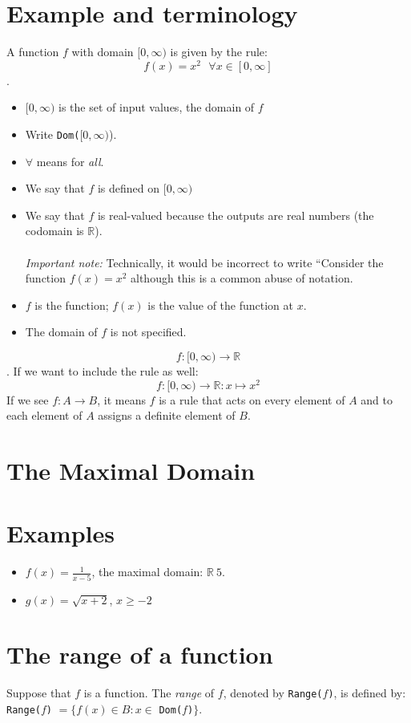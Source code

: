 \section{Example and terminology}
A function $f$ with domain $[0,\infty)$ is given by the rule:
$$f(x) = x^2 ~~~ \forall x \in [0,\infty] $$.
\begin{itemize}
  \item $[0,\infty)$ is the set of input values, the domain of $f$
  \item Write \texttt{Dom($[0,\infty)$}).
  \item $\forall$ means for \emph{all}.
  \item We say that $f$ is defined on $[0,\infty)$
  \item We say that $f$ is real-valued because the outputs are real numbers (the
  codomain is $\mathbb{R}$).\\
  \\
  \emph{Important note:} Technically, it would be incorrect to write ``Consider the function $f(x) = x^2$
  although this is a common abuse of notation.

  \item $f$ is the function; $f(x)$ is the value of the function at $x$.
  \item The domain of $f$ is not specified.  
\end{itemize}

$$f:[0,\infty) \to \mathbb{R}$$.
If we want to include the rule as well:
$$f:[0,\infty) \to \mathbb{R} : x \mapsto x^2$$
If we see $f:A \to B$, it means $f$ is a rule that acts on every element of $A$
and to each element of $A$ assigns a definite element of $B$.

\section{The Maximal Domain}

\section{Examples}
\begin{itemize}
  \item $f(x) = \frac{1}{x-5}$, the maximal domain: $\mathbb{R} \ {5} $.
  \item $g(x) = \sqrt{x+2}$, $x \geq -2$
\end{itemize}

\section{The range of a function}
Suppose that $f$ is a function. The \emph{range} of $f$, denoted by \texttt{Range($f$)},
is defined by:\\
\texttt{Range($f$)} $= \{f(x) \in B : x \in $ \texttt{Dom($f$)}$\}$.

